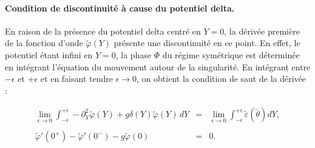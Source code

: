 \paragraph{Condition de discontinuité à cause du potentiel delta.}
En raison de la présence du potentiel delta centré en $Y = 0$, la dérivée première de la fonction d’onde $\tilde{\varphi}(Y)$ présente une discontinuité en ce point. En effet, le potentiel étant infini en $Y = 0$, la phase $\Phi$ du régime symétrique est déterminée en intégrant l’équation du mouvement autour de la singularité. En intégrant entre $- \epsilon$ et $+ \epsilon$ et en faisant tendre $\epsilon \to 0$, on obtient la condition de saut de la dérivée :








\begin{eqnarray*}
	\underset{ \epsilon \to 0 }{\lim} \int_{-\epsilon}^{+\epsilon}  - 	\partial_Y^2\tilde{\varphi}(Y) + g \delta ( Y )\tilde{\varphi}(Y) \, dY  & = & \underset{ \epsilon \to 0 }{\lim}  \int_{-\epsilon}^{+\epsilon}  \tilde{\varepsilon}(\tilde{\theta})d Y ,\\
	\\
	\tilde{\varphi}'(0^+) - \tilde{\varphi}'(0^-) - g \tilde{\varphi} (  0 ) & = & 0 .
\end{eqnarray*}


